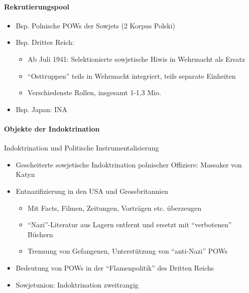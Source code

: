 {}\documentclass[a4paper]{article}
\providecommand{\tightlist}{\setlength{\itemsep}{1mm}\setlength{\parskip}{1mm}}
\begin{document}
\paragraph{Rekrutierungspool}\label{rekrutierungspool}

\begin{itemize}
	\tightlist
	\item
	      Bsp. Polnische POWs der Sowjets (2 Korpus Polski)
	\item
	      Bsp. Drittes Reich:

	      \begin{itemize}
		      \tightlist
		      \item
		            Ab Juli 1941: Selektionierte sowjetische Hiwis in Wehrmacht als
		            Ersatz
		      \item
		            ``Osttruppen'' teils in Wehrmacht integriert, teils separate
		            Einheiten
		      \item
		            Verschiedenste Rollen, insgesamt 1-1,3 Mio.
	      \end{itemize}
	\item
	      Bsp. Japan: INA
\end{itemize}

\paragraph{Objekte der Indoktrination}\label{objekte-der-indoktrination}

Indoktrination und Politische Instrumentalisierung

\begin{itemize}
	\tightlist
	\item
	      Gescheiterte sowjetische Indoktrination polnischer Offiziere: Massaker
	      von Katyn
	\item
	      Entnazifizierung in den USA und Grossbritannien

	      \begin{itemize}
		      \tightlist
		      \item
		            Mit Facts, Filmen, Zeitungen, Vorträgen etc. überzeugen
		      \item
		            ``Nazi''-Literatur aus Lagern entfernt und ersetzt mit
		            ``verbotenen'' Büchern
		      \item
		            Trennung von Gefangenen, Unterstützung von ``anti-Nazi'' POWs
	      \end{itemize}
	\item
	      Bedeutung von POWs in der ``Flamenpolitik'' des Dritten Reichs
	\item
	      Sowjetunion: Indoktrination zweitrangig
\end{itemize}
\end{document}
